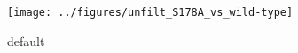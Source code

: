 \documentclass[letterpaper]{article}
\begin{document}
\begin{figure}[htbp]
\begin{center}
\texttt{[image: ../figures/unfilt\_S178A\_vs\_wild-type]}
\caption{default}
\label{default}
\end{center}
\end{figure}
\end{document}
